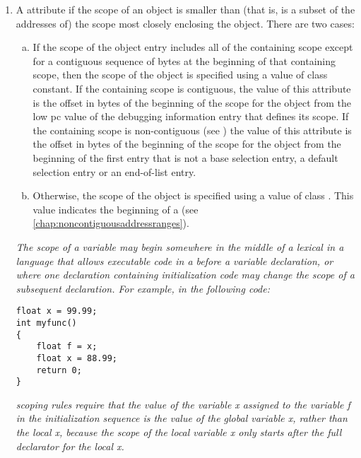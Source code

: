 \begin{enumerate}[1. ]
\item A \DWATstartscope{} 
attribute if the scope of 
an
\hypertarget{chap:DWATstartscopeobjectdeclaration}{}
object is smaller than (that is, is a subset of the addresses
of) the scope most closely enclosing the object. There are
two cases:
\begin{enumerate}[a) ]
\item If the scope of the object entry includes all of the
containing scope except for a contiguous sequence of bytes at
the beginning of that containing scope, then the scope of the
object is specified using a value of class constant. If the
containing scope is contiguous, the value of this attribute
is the offset in bytes of the beginning of the scope for the
object from the low pc value of the debugging information
entry that defines its scope. If the containing scope
is non-contiguous 
(see )
the value of this
attribute is the offset in bytes of the beginning of the scope
for the object from the beginning of the first  entry
that is not a base selection entry, a default selection entry or an end-of-list entry.

\item Otherwise, the scope of the object is specified using
a value of class . 
This value indicates the
beginning of a 
(see \ref{chap:noncontiguousaddressranges}).
\end{enumerate}


\textit{The scope of a variable may begin somewhere in the middle of
a lexical  in a language 
that allows executable code in a
 before a variable declaration, or where one declaration
containing initialization code may change the scope of a
subsequent declaration.  For example, in the following  code:}

\begin{lstlisting}
float x = 99.99;
int myfunc()
{
    float f = x;
    float x = 88.99;
    return 0;
}
\end{lstlisting}

\textit{ scoping rules require that the value of the variable x
assigned to the variable f in the initialization sequence is
the value of the global variable x, rather than the local x,
because the scope of the local variable x only starts after
the full declarator for the local x.}


\end{enumerate}
